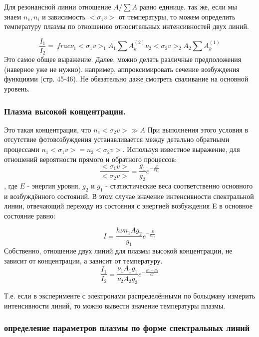 \documentclass[10pt, a4paper]{article}
\begin{document}
Для резонансной линии отношение $A/\sum A $ равно единице. так же, если мы знаем $n_e, n_i$ и зависимость $<\sigma_1 v>$ от температуры, то можем определить температуру плазмы по отношению относительных интенсивностей двух линий.

\begin{equation}
	\frac{I_1}{I_2}= \ frac {\nu_1 <\sigma_1 v>_1 A_1 \sum A_k^{(2)} }{\nu_2 <\sigma_2 v>_2 A_2 \sum A_k^{(1)} }
\end{equation}
Это самое общее выражение. Далее, можно делать различные предположения (наверное уже не нужно). например, аппроксимировать сечение возбуждения функциями (стр. 45-46).
Не обязательно даже смотреть сваливание на основной уровень.

\subsubsection{Плазма высокой концентрации.}
\label{11.2.2}

Это такая концентрация, что $n_e <\sigma_2 v> \gg A$ 
При выполнения этого условия в отсутствие фотовозбуждения устанавливается между детально обратными процессами $n_1 <\sigma_1 v> = n_2 <\sigma_2 v>$.
Используя известное выражение, для отношений вероятности прямого и обратного процессов:
\begin{equation}
	\frac{<\sigma_1 v>}{<\sigma_2 v>} = \frac{g_1}{g_2} e^{-\frac{E}{kT_e}}
\end{equation}
, где $E$ -  энергия уровня, $g_2$ и $g_1$  - статистические веса соответственно основного и возбуждённого состояний.
В этом случае значение интенсивности спектральной линии, отвечающий переходу из состояния с энергией возбуждения E в основное состояние равно:

\begin{equation}
	I=\frac{h \nu n_1 A g_2}{g_1} e^{-\frac{E}{kT_e}}
\end{equation}
Собственно, отношение двух линий для плазмы высокой концентрации, не зависит от концентрации, а зависит от температуру.
\begin{equation}
	\frac{I_1}{I_2}=\frac{ \nu_1 A_1 g_1}{ \nu_2 A_2 g_2} e^{-\frac{E_1 - E_2}{kT}}
\end{equation}

Т.е. если в эксперименте с электронами распределёнными по больцману измерить интенсивности линий, то можно вывести значение температуры плазмы. 

\subsubsection{определение параметров плазмы по форме спектральных линий}
\label{11.2.3}
\end{document}
